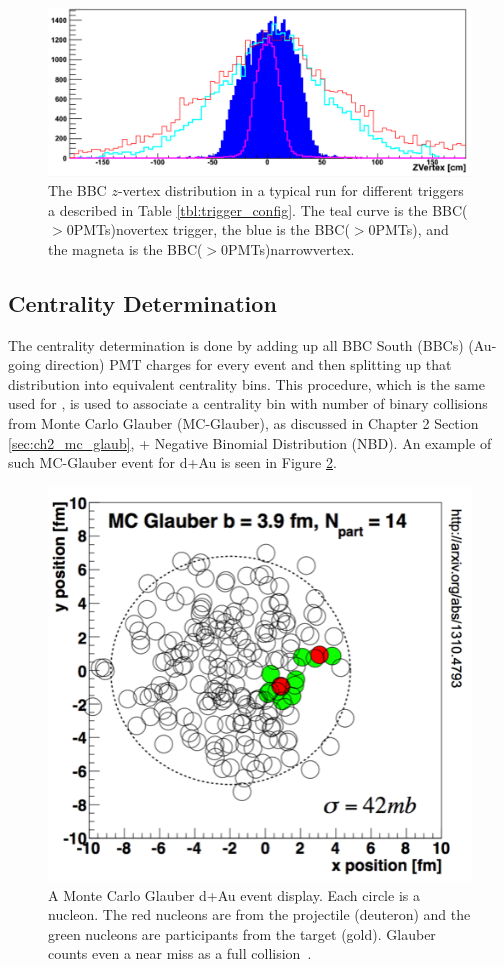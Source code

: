 \begin{figure}[h!]
\begin{center}
\includegraphics[width=0.65\linewidth]{figs/bbc_z_vertex_dist.png}
\caption{The BBC $z$-vertex distribution in a typical \pau run for different triggers a described in Table \ref{tbl:trigger_config}.  The teal curve is the BBC($>$0\thinspace PMTs)\thinspace novertex trigger, the blue is the BBC($>$0\thinspace PMTs), and the magneta is the BBC($>$0\thinspace PMTs)\thinspace narrowvertex.}
\label{fig:bbc_z_vtx_dist}
\end{center}
\end{figure}

\subsection{Centrality Determination}
\label{sec:central_determin}
The centrality determination is done by adding up all BBC South (BBCs) (Au-going direction) PMT charges for every event and then splitting up that distribution into equivalent centrality bins. This procedure, which is the same used for \dau, is used to associate a centrality bin with number of binary collisions from Monte Carlo Glauber (MC-Glauber), as discussed in Chapter 2 Section \ref{sec:ch2_mc_glaub}, + Negative Binomial Distribution (NBD). An example of such MC-Glauber event for d+Au is seen in Figure \ref{fig:glauber_event_display}.  
\label{centrality_determination}
\begin{figure}[!ht]
\begin{center}
\includegraphics[width=0.5\linewidth]{figs/glauber_event_display.png}
\caption{A Monte Carlo Glauber d+Au event display. Each circle is a nucleon. The red nucleons are from the projectile (deuteron) and the green nucleons are participants from the target (gold). Glauber counts even a near miss as a full collision~\cite{PhysRevC.90.034902}.}
\label{fig:glauber_event_display}
\end{center}
\end{figure}

